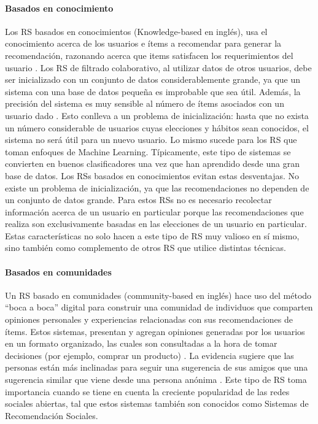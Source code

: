 \paragraph{Basados en conocimiento}
Los RS basados en conocimientos (Knowledge-based en inglés), usa el conocimiento acerca de los usuarios e ítems a recomendar para generar la recomendación, razonando acerca que items satisfacen los requerimientos del usuario \citep{burke2000knowledge}.
Los RS de filtrado colaborativo, al utilizar datos de otros usuarios, debe ser inicializado con un conjunto de datos considerablemente grande, ya que un sistema con una base de datos pequeña es improbable que sea útil. Además, la precisión del sistema es muy sensible al número de ítems asociados con un usuario dado \citep{shardanand1995social}. Esto conlleva a un problema de inicialización: hasta que no exista un número considerable de usuarios cuyas elecciones y hábitos sean conocidos, el sistema no será útil para un nuevo usuario.  Lo mismo sucede para los RS que toman enfoques de Machine Learning. Típicamente, este tipo de sistemas se convierten en buenos clasificadores una vez que han aprendido desde una gran base de datos. Los RSs basados en conocimientos evitan estas desventajas. No existe un problema de inicialización, ya que las recomendaciones no dependen de un conjunto de datos grande. Para estos RSs no es necesario recolectar información acerca de un usuario en particular porque las recomendaciones que realiza son exclusivamente basadas en las elecciones de un usuario en particular. Estas características no solo hacen a este tipo de RS muy valioso en sí mismo, sino también como complemento de otros RS que utilice distintas técnicas. 

\paragraph{Basados en comunidades}
Un RS basado en comunidades (community-based en inglés) hace uso del método “boca a boca” digital para construir una comunidad de individuos que comparten opiniones personales y experiencias relacionadas con sus recomendaciones de ítems. Estos sistemas, presentan y agregan opiniones generadas por los usuarios en un formato organizado, las cuales son consultadas a la hora de tomar decisiones (por ejemplo, comprar un producto) \citep{chen2009community}. La evidencia sugiere que las personas están más inclinadas para seguir una sugerencia de sus amigos que una sugerencia similar que viene desde una persona anónima \citep{sinha2001comparing}. Este tipo de RS toma importancia cuando se tiene en cuenta la creciente popularidad de las redes sociales abiertas, tal que estos sistemas también son conocidos como Sistemas de Recomendación Sociales.

